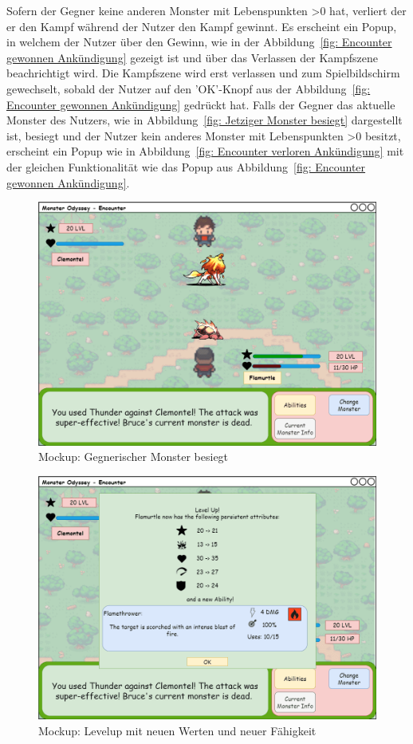 Sofern der Gegner keine anderen Monster mit Lebenspunkten \textgreater  0 hat, verliert der er den Kampf während der Nutzer den Kampf gewinnt. 
Es erscheint ein Popup, in welchem der Nutzer über den Gewinn, wie in der Abbildung~\ref{fig: Encounter gewonnen Ankündigung} gezeigt ist und über das Verlassen der Kampfszene beachrichtigt wird.
Die Kampfszene wird erst verlassen und zum Spielbildschirm gewechselt, sobald der Nutzer auf den 'OK'-Knopf aus der Abbildung~\ref{fig: Encounter gewonnen Ankündigung} gedrückt hat.
Falls der Gegner das aktuelle Monster des Nutzers, wie in Abbildung~\ref{fig: Jetziger Monster besiegt} dargestellt ist, besiegt und der Nutzer kein anderes Monster mit Lebenspunkten \textgreater  0 besitzt, erscheint ein Popup wie in Abbildung~\ref{fig: Encounter verloren Ankündigung} mit der gleichen Funktionalität wie das Popup aus Abbildung~\ref{fig: Encounter gewonnen Ankündigung}.
\begin{figure}[H]
    \center
    \includegraphics[scale=\scale]{images/mockups/Encounter/Encounter1v1AbilitiesUsedWon.png}
    \caption{Mockup: Gegnerischer Monster besiegt}
    \label{fig: Gegnerischen Monster besiegt}
\end{figure}
\begin{figure}[H]
    \center
    \includegraphics[scale=\scale]{images/mockups/Encounter/Encounter1v1AbilitiesUsedWonLevelUp.png}
    \caption{Mockup: Levelup mit neuen Werten und neuer Fähigkeit}
    \label{fig: Levelup mit neuen Werten und neuer Fähigkeit}
\end{figure}
